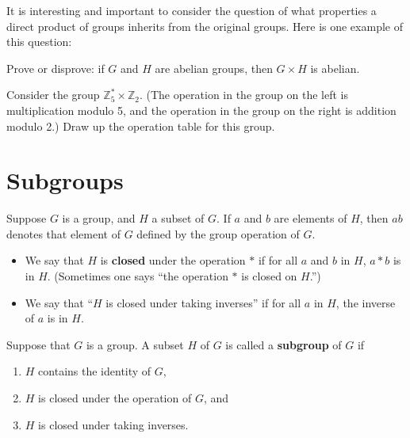 It is interesting and important to consider the question of what properties a direct product of groups inherits from the original groups. Here is one example of this question:

\begin{problem}
Prove or disprove: if \(G\) and \(H\) are abelian groups, then \(G \times H\) is abelian.
\end{problem}

\begin{problem}
Consider the group \(\mathbb{Z}_5^* \times \mathbb{Z}_2\). (The operation in the group on the left is multiplication modulo 5, and the operation in the group on the right is addition modulo 2.) Draw up the operation table for this group.
\end{problem}

\section{Subgroups}

Suppose \(G\) is a group, and \(H\) a subset of \(G\). If \(a\) and \(b\) are elements of \(H\), then \(ab\) denotes that element of \(G\) defined by the group operation of \(G\).

\begin{definition} \mbox{}
\begin{itemize}[itemsep=0pt, topsep=3pt]
  \item We say that \(H\) is \textbf{closed} under the operation $*$ if for all \(a\) and \(b\) in \(H\), \(a*b\) is in \(H\). (Sometimes one says ``the operation $*$ is closed on \(H\).'')
  \item We say that ``\(H\) is closed under taking inverses'' if for all \(a\) in \(H\), the inverse of \(a\) is in \(H\).
\end{itemize}
\end{definition}

\begin{definition}
Suppose that \(G\) is a group. A subset \(H\) of \(G\) is called a \textbf{subgroup} of \(G\) if
\begin{enumerate}[itemsep=0pt, topsep=3pt]
  \item \(H\) contains the identity of \(G\),
  \item \(H\) is closed under the operation of \(G\), and
  \item \(H\) is closed under taking inverses.
\end{enumerate}
\end{definition}

